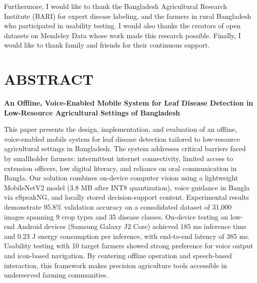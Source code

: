 \documentclass[12pt,letterpaper]{report}
\begin{document}
Furthermore, I would like to thank the Bangladesh Agricultural Research Institute (BARI) for expert disease labeling, and the farmers in rural Bangladesh who participated in usability testing. I would also thanks the creators of open datasets on Mendeley Data whose work made this research possible. Finally, I would like to thank family and friends for their continuous support.

\chapter*{ABSTRACT}

\begin{center}
{\fontsize{18}{22}\selectfont\bfseries An Offline, Voice-Enabled Mobile System for Leaf Disease Detection in Low-Resource Agricultural Settings of Bangladesh}
\end{center}

\vspace{12pt}

\hspace{0.39in}This paper presents the design, implementation, and evaluation of an offline, voice-enabled mobile system for leaf disease detection tailored to low-resource agricultural settings in Bangladesh. The system addresses critical barriers faced by smallholder farmers: intermittent internet connectivity, limited access to extension officers, low digital literacy, and reliance on oral communication in Bangla. Our solution combines on-device computer vision using a lightweight MobileNetV2 model (3.8 MB after INT8 quantization), voice guidance in Bangla via eSpeakNG, and locally stored decision-support content. Experimental results demonstrate 95.8\% validation accuracy on a consolidated dataset of 31,000 images spanning 9 crop types and 35 disease classes. On-device testing on low-end Android devices (Samsung Galaxy J2 Core) achieved 185 ms inference time and 0.23 J energy consumption per inference, with end-to-end latency of 385 ms. Usability testing with 10 target farmers showed strong preference for voice output and icon-based navigation. By centering offline operation and speech-based interaction, this framework makes precision agriculture tools accessible in underserved farming communities.

\clearpage
{}
{}
{
\renewcommand{\contentsname}{\centering\fontsize{18}{22}\selectfont\bfseries TABLE OF CONTENTS}
\setlength{\parskip}{0pt}
\tableofcontents
}
\end{document}
